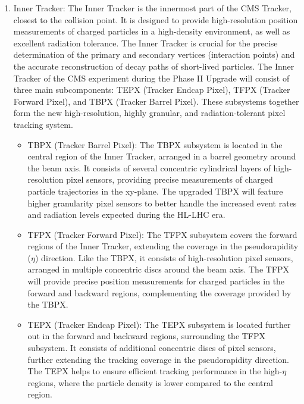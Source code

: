 \begin{enumerate}

\item Inner Tracker: The Inner Tracker is the innermost part of the CMS Tracker, closest to the collision point. It is designed to provide high-resolution position measurements of charged particles in a high-density environment, as well as excellent radiation tolerance. The Inner Tracker is crucial for the precise determination of the primary and secondary vertices (interaction points) and the accurate reconstruction of decay paths of short-lived particles. The Inner Tracker of the CMS experiment during the Phase II Upgrade will consist of three main subcomponents: TEPX (Tracker Endcap Pixel), TFPX (Tracker Forward Pixel), and TBPX (Tracker Barrel Pixel). These subsystems together form the new high-resolution, highly granular, and radiation-tolerant pixel tracking system.

\begin{itemize}

\item TBPX (Tracker Barrel Pixel): The TBPX subsystem is located in the central region of the Inner Tracker, arranged in a barrel geometry around the beam axis. It consists of several concentric cylindrical layers of high-resolution pixel sensors, providing precise measurements of charged particle trajectories in the xy-plane. The upgraded TBPX will feature higher granularity pixel sensors to better handle the increased event rates and radiation levels expected during the HL-LHC era.

\item TFPX (Tracker Forward Pixel): The TFPX subsystem covers the forward regions of the Inner Tracker, extending the coverage in the pseudorapidity ($\eta$) direction. Like the TBPX, it consists of high-resolution pixel sensors, arranged in multiple concentric discs around the beam axis. The TFPX will provide precise position measurements for charged particles in the forward and backward regions, complementing the coverage provided by the TBPX.

\item TEPX (Tracker Endcap Pixel): The TEPX subsystem is located further out in the forward and backward regions, surrounding the TFPX subsystem. It consists of additional concentric discs of pixel sensors, further extending the tracking coverage in the pseudorapidity direction. The TEPX helps to ensure efficient tracking performance in the high-$\eta$ regions, where the particle density is lower compared to the central region.


\end{itemize}
\end{enumerate}
